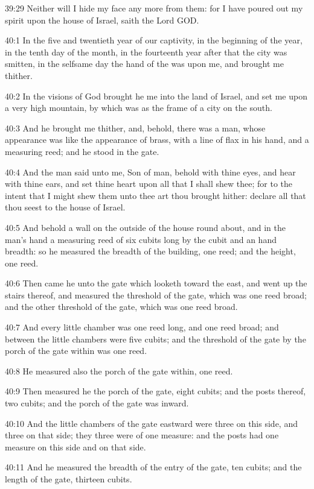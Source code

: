 39:29 Neither will I hide my face any more from them: for I have
poured out my spirit upon the house of Israel, saith the Lord GOD.

40:1 In the five and twentieth year of our captivity, in the beginning
of the year, in the tenth day of the month, in the fourteenth year
after that the city was smitten, in the selfsame day the hand of the
\LORD was upon me, and brought me thither.

40:2 In the visions of God brought he me into the land of Israel, and
set me upon a very high mountain, by which was as the frame of a city
on the south.

40:3 And he brought me thither, and, behold, there was a man, whose
appearance was like the appearance of brass, with a line of flax in
his hand, and a measuring reed; and he stood in the gate.

40:4 And the man said unto me, Son of man, behold with thine eyes, and
hear with thine ears, and set thine heart upon all that I shall shew
thee; for to the intent that I might shew them unto thee art thou
brought hither: declare all that thou seest to the house of Israel.

40:5 And behold a wall on the outside of the house round about, and in
the man's hand a measuring reed of six cubits long by the cubit and an
hand breadth: so he measured the breadth of the building, one reed;
and the height, one reed.

40:6 Then came he unto the gate which looketh toward the east, and
went up the stairs thereof, and measured the threshold of the gate,
which was one reed broad; and the other threshold of the gate, which
was one reed broad.

40:7 And every little chamber was one reed long, and one reed broad;
and between the little chambers were five cubits; and the threshold of
the gate by the porch of the gate within was one reed.

40:8 He measured also the porch of the gate within, one reed.

40:9 Then measured he the porch of the gate, eight cubits; and the
posts thereof, two cubits; and the porch of the gate was inward.

40:10 And the little chambers of the gate eastward were three on this
side, and three on that side; they three were of one measure: and the
posts had one measure on this side and on that side.

40:11 And he measured the breadth of the entry of the gate, ten
cubits; and the length of the gate, thirteen cubits.

